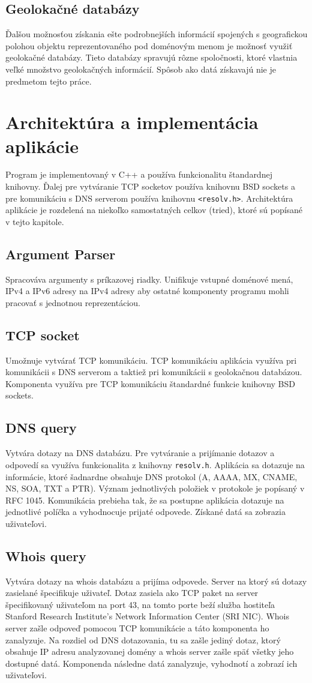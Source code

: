 \documentclass[a4paper, 11pt]{article}
\begin{document}
\subsection{Geolokačné databázy}
Ďalšou možnosťou získania ešte podrobnejších informácií spojených s geografickou polohou objektu reprezentovaného pod doménovým menom je možnosť využiť geolokačné databázy. Tieto databázy spravujú rôzne spoločnosti, ktoré vlastnia  veľké množstvo geolokačných informácií. Spôsob ako datá získavajú nie je predmetom tejto práce.

\section{Architektúra a implementácia aplikácie}
Program je implementovaný v C++ a používa funkcionalitu štandardnej knihovny. Ďalej pre vytváranie TCP socketov používa knihovnu BSD sockets a pre komunikáciu s DNS serverom používa knihovnu \texttt{<resolv.h>}. Architektúra aplikácie je rozdelená na niekoľko samostatných celkov (tried), ktoré sú popísané v tejto kapitole.
\subsection{Argument Parser} Spracováva argumenty s príkazovej riadky. Unifikuje vstupné doménové mená, IPv4 a IPv6 adresy na IPv4 adresy aby ostatné komponenty programu mohli pracovať s jednotnou reprezentáciou.
\subsection{TCP socket} Umožnuje vytvárať TCP komunikáciu. TCP komunikáciu aplikácia využíva pri komunikácii s DNS serverom a taktiež pri komunikácii s geolokačnou databázou. Komponenta využíva pre TCP komunikáciu štandardné funkcie knihovny BSD sockets.
\subsection{DNS query} Vytvára dotazy na DNS databázu. Pre vytváranie a prijímanie dotazov a odpovedí sa využíva funkcionalita z knihovny \texttt{resolv.h}. Aplikácia sa dotazuje na informácie, ktoré šadnardne obsahuje DNS protokol (A, AAAA, MX, CNAME, NS, SOA, TXT a PTR). Význam jednotlivých položiek v protokole je popísaný v RFC 1045\cite{RFC1035}. Komunikácia prebieha tak, že sa postupne aplikácia dotazuje na jednotlivé políčka a vyhodnocuje prijaté odpovede. Získané datá sa zobrazia uživateľovi.
\subsection{Whois query} Vytvára dotazy na whois databázu a prijíma odpovede. Server na ktorý sú dotazy zasielané špecifikuje uživateľ. Dotaz zasiela ako TCP paket na server špecifikovaný uživateľom na port 43, na tomto porte beží služba hostiteľa Stanford Research Institute’s Network Information Center (SRI NIC\cite{RFC0954}). Whois server zašle odpoveď pomocou TCP komunikácie a táto komponenta ho zanalyzuje. Na rozdiel od DNS dotazovania, tu sa zašle jediný dotaz, ktorý obsahuje IP adresu analyzovanej domény a whois server zašle späť všetky jeho dostupné datá. Komponenda následne datá zanalyzuje, vyhodnotí a zobrazí ich uživateľovi.
\end{document}
